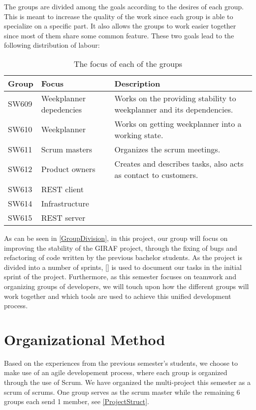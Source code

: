 The groups are divided among the goals according to the desires of each group.
This is meant to increase the quality of the work since each group is able to
specialize on a specific part. It also allows the groups to work easier together
since most of them share some common feature. These two goals lead to the
following distribution of labour:

\begin{table}[H]
\centering
\begin{tabular}{|p{2cm}|p{3cm}|p{8cm}|}
\hline
Group & Focus & Description \\ \hline
SW609 & Weekplanner depedencies & Works on the providing stability to
weekplanner and its dependencies.\\\hline 
SW610 & Weekplanner & Works on getting weekplanner into a working
state.\\
\hline SW611 & Scrum masters & Organizes the scrum meetings. \\\hline 
SW612 & Product owners & Creates and describes tasks, also acts as contact to
customers. \\\hline 
SW613 & REST client & \\ \hline

SW614 & Infrastructure & \\ \hline

SW615 & REST server & \\ \hline

\end{tabular}
\caption{The focus of each of the groups}
\label{GroupDivision}
\end{table}

As can be seen in \autoref{GroupDivision}, in this project, our group will focus
on improving the stability of the GIRAF project, through the fixing of bugs and
refactoring of code written by the previous bachelor students. As the project is
divided into a number of sprints, \autoref{} is used to document our tasks in
the initial sprint of the project. Furthermore, as this semester focuses on
teamwork and organizing groups of developers, we will touch upon how the
different groups will work together and which tools are used to achieve this
unified development process.

\section{Organizational Method}

Based on the experiences from the previous semester's students, we choose to
make use of an agile developement process, where each group is organized
through the use of Scrum. We have organized the multi-project this semester as
a scrum of scrums. One group serves as the scrum master while the remaining 6
groups each send 1 member, see \autoref{ProjectStruct}.

